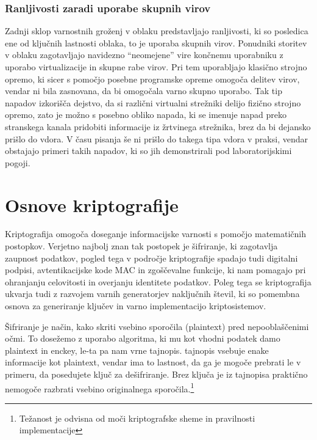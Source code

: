 \documentclass[12pt,a4paper,openany,tikz]{book}
\theoremstyle{plain}
\theoremstyle{definition}
\begin{document}
\subsection{Ranljivosti zaradi uporabe skupnih virov}
\label{sub:Ranljivosti zaradi uporabe skupnih virov}

Zadnji sklop varnostnih groženj v oblaku predstavljajo ranljivosti, ki so posledica ene od ključnih lastnosti oblaka, to je uporaba skupnih virov. Ponudniki storitev v oblaku zagotavljajo navidezno ``neomejene'' vire končnemu uporabniku z uporabo virtualizacije in skupne rabe virov. Pri tem uporabljajo klasično strojno opremo, ki sicer s pomočjo posebne programske opreme omogoča delitev virov, vendar ni bila zasnovana, da bi omogočala varno skupno uporabo. Tak tip napadov izkorišča dejstvo, da si različni virtualni strežniki delijo fizično strojno opremo, zato je možno s posebno obliko napada, ki se imenuje napad preko stranskega kanala pridobiti informacije iz žrtvinega strežnika, brez da bi dejansko prišlo do vdora. V času pisanja še ni prišlo do takega tipa vdora v praksi, vendar obstajajo primeri takih napadov, ki so jih demonstrirali pod laboratorijskimi pogoji.

\chapter{Osnove kriptografije}

Kriptografija omogoča doseganje informacijske varnosti s pomočjo matematičnih postopkov. Verjetno najbolj znan tak postopek je šifriranje, ki zagotavlja zaupnost podatkov, pogled tega v področje kriptografije spadajo tudi digitalni podpisi, avtentikacijske kode MAC in zgoščevalne funkcije, ki nam pomagajo pri ohranjanju celovitosti in overjanju identitete podatkov. Poleg tega se kriptografija ukvarja tudi z razvojem varnih generatorjev naključnih števil, ki so pomembna osnova za generiranje ključev in varno implementacijo kriptosistemov.

Šifriranje je način, kako skriti vsebino sporočila (\gls{plaintext}) pred nepooblaščenimi očmi. To dosežemo z uporabo algoritma, ki mu kot vhodni podatek damo \gls{plaintext} in \gls{enckey}, le-ta pa nam vrne \gls{tajnopis}. \Gls{tajnopis} vsebuje enake informacije kot \gls{plaintext}, vendar ima to lastnost, da ga je mogoče prebrati le v primeru, da posedujete ključ za dešifriranje. Brez ključa je iz \gls{tajnopis}a praktično nemogoče razbrati vsebino originalnega sporočila.\footnote{Težanost je odvisna od moči kriptografske sheme in pravilnosti implementacije}
\end{document}
